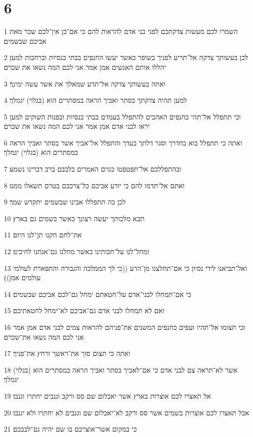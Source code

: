 \chapter{6}

\par 1 השמרו לכם מעשות צדקתכם לפני בני אדם להראות להם כי אם־כן אין־לכם שכר מאת אביכם שבשמים׃
\par 2 לכן בעשותך צדקה אל־תריע לפניך בשופר כאשר יעשו החנפים בבתי כנסיות וברחבות למען יהללו אותם האנשים אמן אמר אני לכם המה נשאו את שכרם׃
\par 3 ואתה בעשותך צדקה אל־תדע שמאלך את אשר עשה ימינך׃
\par 4 למען תהיה צדקתך בסתר ואביך הראה במסתרים הוא (בגלוי) יגמלך׃
\par 5 וכי תתפלל אל־תהי כחנפים האהבים להתפלל בעמדם בבתי כנסיות ובפנות השוקים למען יראו לבני אדם אמן אמר אני לכם המה נשאו את שכרם׃
\par 6 ואתה כי תתפלל בוא בחדרך וסגר דלתך בעדך והתפלל אל־אביך אשר בסתר ואביך הראה במסתרים הוא (בגלוי) יגמלך׃
\par 7 ובהתפללכם אל־תפטפטו כגוים האמרים בלבבם ברב דברינו נשמע׃
\par 8 ואתם אל־תדמו להם כי יודע אביכם כל־צרככם בטרם תשאלו ממנו׃
\par 9 לכן כה תתפללו אבינו שבשמים יתקדש שמך׃
\par 10 תבא מלכותך יעשה רצונך כאשר בשמים גם בארץ׃
\par 11 את־לחם חקנו תן־לנו היום׃
\par 12 ומחל־לנו על־חבותינו כאשר מחלנו גם־אנחנו לחיבינו׃
\par 13 ואל־תביאנו לידי נסיון כי אם־תחלצנו מן־הרע ((כי לך הממלכה והגבורה והתפארת לעולמי עולמים אמן))׃
\par 14 כי אם־תמחלו לבני־אדם על־חטאתם ימחל גם־לכם אביכם שבשמים׃
\par 15 ואם לא תמחלו לבני אדם גם־אביכם לא־ימחל לחטאתיכם׃
\par 16 וכי תצומו אל־תהיו זעפים כחנפים המשנים את־פניהם להראות צמים לבני אדם אמן אמר אני לכם המה נשאו את־שכרם׃
\par 17 ואתה כי תצום סוך את־ראשך ורחץ את־פניך׃
\par 18 אשר לא־תראה צם לבני אדם כי אם־לאביך בסתר ואביך הראה במסתרים הוא (בגלוי) יגמלך׃
\par 19 אל תאצרו לכם אוצרות בארץ אשר יאכלום שם סס ורקב וגנבים יחתרו וגנבו׃
\par 20 אבל תאצרו לכם אוצרות בשמים אשר סס ורקב לא־יאכלום שם וגנבים לא יחתרו ולא יגנבו׃
\par 21 כי במקום אשר־אוצרכם בו שם יהיה גם־לבבכם׃
